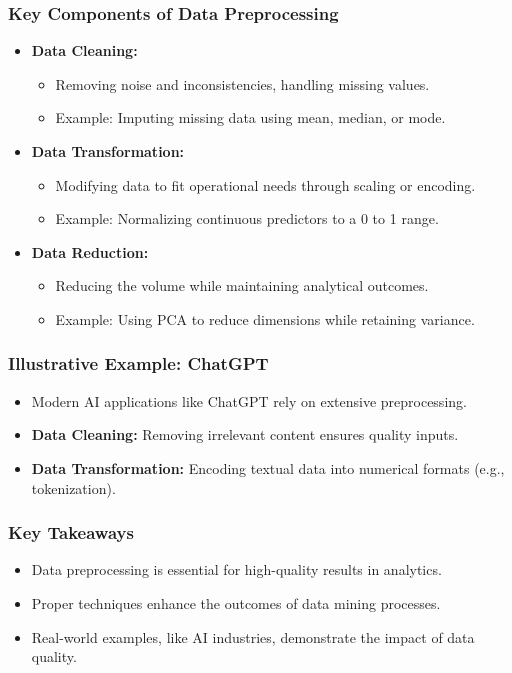 \documentclass[aspectratio=169]{beamer}
\begin{document}
\begin{frame}[fragile]
    \frametitle{Key Components of Data Preprocessing}
    \begin{itemize}
        \item \textbf{Data Cleaning:}
            \begin{itemize}
                \item Removing noise and inconsistencies, handling missing values.
                \item Example: Imputing missing data using mean, median, or mode.
            \end{itemize}
        \item \textbf{Data Transformation:}
            \begin{itemize}
                \item Modifying data to fit operational needs through scaling or encoding.
                \item Example: Normalizing continuous predictors to a 0 to 1 range.
            \end{itemize}
        \item \textbf{Data Reduction:}
            \begin{itemize}
                \item Reducing the volume while maintaining analytical outcomes.
                \item Example: Using PCA to reduce dimensions while retaining variance.
            \end{itemize}
    \end{itemize}
\end{frame}

\begin{frame}[fragile]
    \frametitle{Illustrative Example: ChatGPT}
    \begin{itemize}
        \item Modern AI applications like ChatGPT rely on extensive preprocessing.
        \item \textbf{Data Cleaning:} Removing irrelevant content ensures quality inputs.
        \item \textbf{Data Transformation:} Encoding textual data into numerical formats (e.g., tokenization).
    \end{itemize}
\end{frame}

\begin{frame}[fragile]
    \frametitle{Key Takeaways}
    \begin{itemize}
        \item Data preprocessing is essential for high-quality results in analytics.
        \item Proper techniques enhance the outcomes of data mining processes.
        \item Real-world examples, like AI industries, demonstrate the impact of data quality.
    \end{itemize}
\end{frame}
\end{document}
